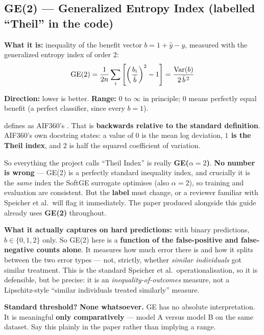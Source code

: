 \subsection{GE(2) --- Generalized Entropy Index (labelled ``Theil'' in the code)}

\textbf{What it is:} inequality of the benefit vector $b = 1 + \hat y - y$,
measured with the generalized entropy index of order $2$:
\begin{equation}
\mathrm{GE}(2) = \frac{1}{2n}\sum_i\left[\left(\frac{b_i}{\bar b}\right)^{2} - 1\right]
       = \frac{\mathrm{Var}(b)}{2\,\bar b^{\,2}}
\end{equation}

\textbf{Direction:} lower is better. \textbf{Range:} $0$ to $\infty$ in
principle; $0$ means perfectly equal benefit (a perfect classifier, since every
$b=1$).

\begin{warnbox}
 defines  as AIF360's
. That is \textbf{backwards
relative to the standard definition}. AIF360's own docstring states: a value of
$0$ is the mean log deviation, \textbf{$1$ is the Theil index}, and $2$ is half
the squared coefficient of variation.

So everything the project calls ``Theil Index'' is really \textbf{GE($\alpha=2$)}.
\textbf{No number is wrong} --- GE(2) is a perfectly standard inequality index,
and crucially it is the \emph{same} index the SoftGE surrogate optimises (also
$\alpha=2$), so training and evaluation are consistent. But the \textbf{label}
must change, or a reviewer familiar with Speicher et al.\ will flag it
immediately. The paper produced alongside this guide already uses
\textbf{GE(2)} throughout.
\end{warnbox}

\textbf{What it actually captures on hard predictions:} with binary
predictions, $b \in \{0,1,2\}$ only. So GE(2) here is a \textbf{function of the
false-positive and false-negative counts alone}. It measures how much error
there is and how it splits between the two error types --- not, strictly, whether
\emph{similar individuals} got similar treatment. This is the standard Speicher
et al.\ operationalisation, so it is defensible, but be precise: it is an
\emph{inequality-of-outcomes} measure, not a Lipschitz-style ``similar
individuals treated similarly'' measure.

\textbf{Standard threshold?} \textbf{None whatsoever.} GE has no absolute
interpretation. It is meaningful \textbf{only comparatively} --- model A versus
model B on the same dataset. Say this plainly in the paper rather than implying
a range.

